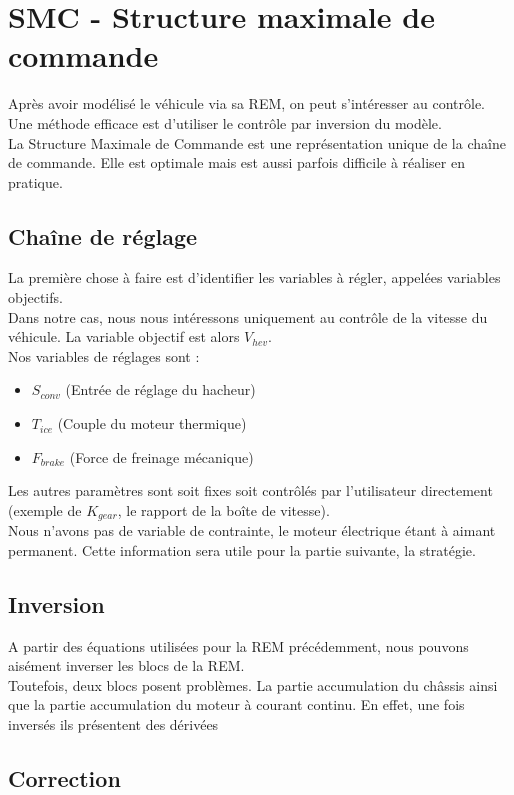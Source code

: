 \section{SMC - Structure maximale de commande}
Après avoir modélisé le véhicule via sa REM, on peut s'intéresser au contrôle. Une méthode efficace est d'utiliser le contrôle par inversion du modèle.\\

La Structure Maximale de Commande est une représentation unique de la chaîne de commande. Elle est optimale mais est aussi parfois difficile à réaliser en pratique.\\

\subsection{Chaîne de réglage}
La première chose à faire est d'identifier les variables à régler, appelées variables objectifs.\\
Dans notre cas, nous nous intéressons uniquement au contrôle de la vitesse du véhicule. La variable objectif est alors $V_{hev}$.\\

Nos variables de réglages sont : 
\begin{itemize}
\item $S_{conv}$ (Entrée de réglage du hacheur)
\item $T_{ice}$ (Couple du moteur thermique)
\item $F_{brake}$ (Force de freinage mécanique)
\end{itemize}

Les autres paramètres sont soit fixes soit contrôlés par l'utilisateur directement (exemple de $K_{gear}$, le rapport de la boîte de vitesse).\\

Nous n'avons pas de variable de contrainte, le moteur électrique étant à aimant permanent. Cette information sera utile pour la partie suivante, la stratégie.\\


\subsection{Inversion}
A partir des équations utilisées pour la REM précédemment, nous pouvons aisément inverser les blocs de la REM.\\


Toutefois, deux blocs posent problèmes. La partie accumulation du châssis ainsi que la partie accumulation du moteur à courant continu. En effet, une fois inversés ils présentent des dérivées 

\subsection{Correction}
